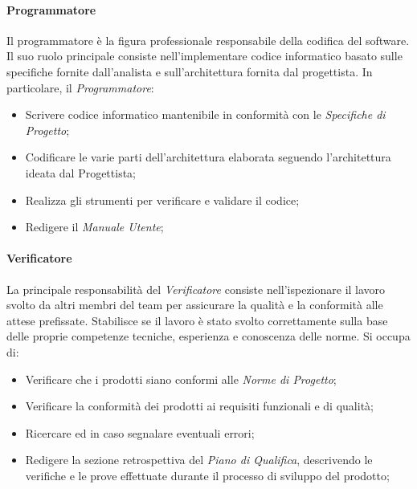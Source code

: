 \documentclass{article}
\begin{document}
        \paragraph{Programmatore}\label{programmatore}Il programmatore è la figura professionale responsabile della codifica del software. Il suo ruolo principale consiste nell'implementare codice informatico basato sulle specifiche fornite dall'analista e sull'architettura fornita dal progettista. In particolare, il \textit{Programmatore}:
        \begin{itemize}
            \item Scrivere codice informatico mantenibile in conformità con le \textit{Specifiche di Progetto};
            \item Codificare le varie parti dell'architettura elaborata seguendo l'architettura ideata dal Progettista;
            \item Realizza gli strumenti per verificare e validare il codice;
            \item Redigere il \textit{Manuale Utente};
        \end{itemize} 
        \paragraph{Verificatore}\label{verificatore} La principale responsabilità del \textit{Verificatore} consiste nell'ispezionare il lavoro svolto da altri membri del team per assicurare la qualità e la conformità alle attese prefissate. Stabilisce se il lavoro è stato svolto correttamente sulla base delle proprie competenze tecniche, esperienza e conoscenza delle norme. Si occupa di:
        \begin{itemize}
            \item Verificare che i prodotti siano conformi alle \textit{Norme di Progetto};
            \item Verificare la conformità dei prodotti ai requisiti funzionali e di qualità;
            \item Ricercare ed in caso segnalare eventuali errori;
            \item Redigere la sezione retrospettiva del \textit{Piano di Qualifica}, descrivendo le verifiche e le prove effettuate durante il processo di sviluppo del prodotto;
        \end{itemize}          
\end{document}
